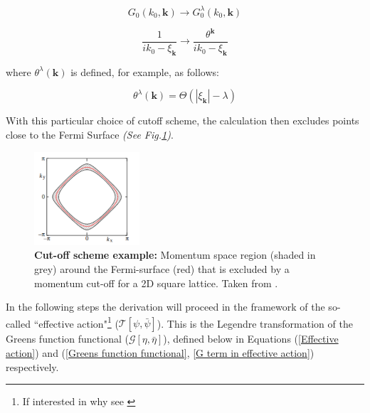 \documentclass[11pt]{article}
\begin{document}
\begin{equation} \label{propagator transform 1}
    G_0(k_0, \textbf{k}) \rightarrow G_0^{\lambda}(k_0, \textbf{k})
\end{equation}


\begin{equation} \label{propagator transform 2}
    \frac{1}{ik_0 - \xi_{\textbf{k}}} \rightarrow \frac{\theta^{\textbf{k}}}{ik_0 - \xi_{\textbf{k}}}
\end{equation}

\noindent where $\theta^{\lambda}(\textbf{k})$ is defined, for example, as follows:

\begin{equation} \label{theta def}
    \theta^{\lambda}(\textbf{k}) = \Theta(|\xi_{\textbf{k}}| - \lambda)    
\end{equation}

\noindent With this particular choice of cutoff scheme, the calculation then excludes points close to the Fermi Surface \textit{(See Fig.\ref{fig:Truncation})}. \par
\begin{figure}[htbp]  %
    \centering
    \includegraphics[width=0.35\textwidth]{Truncation.png}  %
    \caption{\textbf{Cut-off scheme example:} Momentum space region (shaded in grey) around the Fermi-surface (red) that is excluded 
    by a momentum cut-off for a 2D square lattice. Taken from \cite {metzner2012functional}.}
    \label{fig:Truncation}
\end{figure}

\medskip
\noindent In the following steps the derivation will proceed in the framework of the  so-called ``effective action"\footnote{If interested in why see \cite{metzner2012functional}}  ($\mathcal{T}[\psi, \bar{\psi}]$).
This is the Legendre transformation of the Greens function functional ($\mathcal{G}[\eta, \bar{\eta}]$), defined below in Equations (\ref{Effective action})  and  (\ref{Greens function functional}, \ref{G term in effective action}) respectively. 
\end{document}
